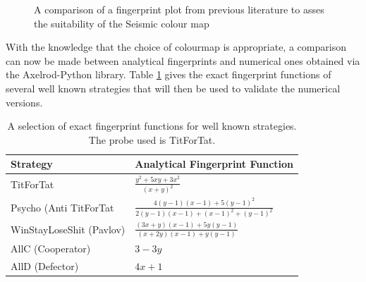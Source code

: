\begin{figure}[hbtp!]
\centering
{}
\caption{A comparison of a fingerprint plot from previous literature to asses the suitability of the Seismic colour map}
\label{fig:WSLS-ashlock-comparison}
\end{figure}

With the knowledge that the choice of colourmap is appropriate, a comparison can now be made between analytical fingerprints and numerical ones obtained via the Axelrod-Python library.
Table \ref{tab:fingerprint-functions} gives the exact fingerprint functions of several well known strategies that will then be used to validate the numerical versions.

\begin{table}[htbp]
\centering
\renewcommand{\arraystretch}{2}
\setlength{\tabcolsep}{12pt}
\begin{tabular}{l l}
\toprule
Strategy & Analytical Fingerprint Function\\
\midrule
TitForTat &  $\displaystyle \frac{y^2 + 5xy + 3x^2}{(x + y)^2} $\\
Psycho (Anti TitForTat& $\displaystyle \frac{4(y-1)(x-1) + 5(y-1)^2}{2(y-1)(x-1) + (x-1)^2 + (y-1)^2} $ \\
WinStayLoseShit (Pavlov) & $\displaystyle \frac{(3x+y)(x-1) + 5y(y-1)}{(x+2y)(x-1) + y(y-1)} $\\
AllC (Cooperator) & $\displaystyle 3 - 3y $ \\
AllD (Defector) & $\displaystyle 4x + 1 $\\
\bottomrule
\end{tabular}
\caption{A selection of exact fingerprint functions for well known strategies. The probe used is TitForTat.}
\label{tab:fingerprint-functions}
\end{table}

